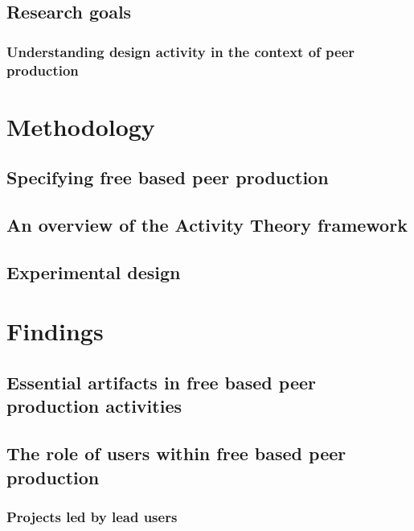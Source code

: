 \documentclass{ICED-Paper}%
\begin{document}
\subsection{Research goals}

\subsubsection{Understanding design activity in the context of peer production}

\section{Methodology}

\subsection{Specifying free based peer production}

\subsection{An overview of  the Activity Theory framework}

\subsection{Experimental design}

\section{Findings}
\subsection{Essential artifacts in free based peer production activities}

\subsection{The role of users within free based peer production}

\subsubsection{Projects led by lead users}
\end{document}
